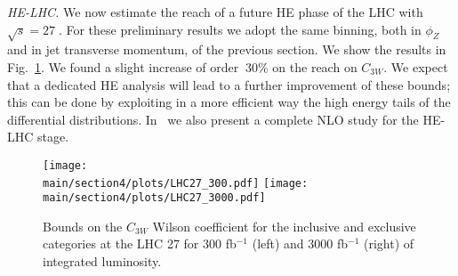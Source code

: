 \noindent
\emph{HE-LHC.}
We now estimate the reach of a future HE phase of the LHC with
$\sqrt{s}=27\;$\UTeV. For these preliminary results we adopt the same binning, both in $\phi_Z$ and in jet transverse momentum, of the previous section. We show the results in Fig.~\ref{fig:LHC27}. We found a slight increase of order $~30\%$ on the reach on $C_{3W}$. We expect that a dedicated HE analysis will lead to a further improvement of these bounds; this can be done by exploiting in a more efficient way the high energy tails of the differential distributions. In~\cite{Azatov:2019xxn} we also present a complete NLO study for the HE-LHC stage. 


  \begin{figure}[ht]
\begin{center}
 \texttt{[image: \\main/section4/plots/LHC27\_300.pdf]}{}\hspace{2cm}
 \texttt{[image: \\main/section4/plots/LHC27\_3000.pdf]}{}
\end{center}
\caption{Bounds on the $C_{3W}$ Wilson coefficient for the inclusive and exclusive categories at the LHC 27 for 300 fb$^{-1}$ (left) and 3000 fb$^{-1}$ (right) of integrated luminosity.}
\label{fig:LHC27}
\end{figure}


